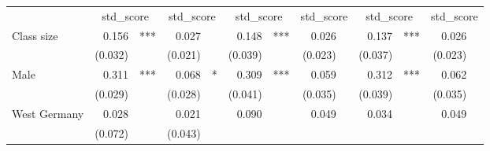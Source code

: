 \documentclass{article}
\begin{document}
\begin{table}[!h]
\centering
\begin{tabular}{lllllllllllll}
\cline{1-13}
\multicolumn{1}{r}{} &
  \multicolumn{2}{c}{std\_score} &
  \multicolumn{2}{c}{std\_score} &
  \multicolumn{2}{c}{std\_score} &
  \multicolumn{2}{c}{std\_score} &
  \multicolumn{2}{c}{std\_score} &
  \multicolumn{2}{c}{std\_score} \\
\cline{1-13}
\multicolumn{1}{l}{Class size} &
  \multicolumn{1}{r}{0.156} &
  \multicolumn{1}{l}{***} &
  \multicolumn{1}{r}{0.027} &
  \multicolumn{1}{l}{} &
  \multicolumn{1}{r}{0.148} &
  \multicolumn{1}{l}{***} &
  \multicolumn{1}{r}{0.026} &
  \multicolumn{1}{l}{} &
  \multicolumn{1}{r}{0.137} &
  \multicolumn{1}{l}{***} &
  \multicolumn{1}{r}{0.026} &
  \multicolumn{1}{l}{} \\
\multicolumn{1}{l}{} &
  \multicolumn{1}{r}{(0.032)} &
  \multicolumn{1}{l}{} &
  \multicolumn{1}{r}{(0.021)} &
  \multicolumn{1}{l}{} &
  \multicolumn{1}{r}{(0.039)} &
  \multicolumn{1}{l}{} &
  \multicolumn{1}{r}{(0.023)} &
  \multicolumn{1}{l}{} &
  \multicolumn{1}{r}{(0.037)} &
  \multicolumn{1}{l}{} &
  \multicolumn{1}{r}{(0.023)} &
  \multicolumn{1}{l}{} \\
\multicolumn{1}{l}{Male} &
  \multicolumn{1}{r}{0.311} &
  \multicolumn{1}{l}{***} &
  \multicolumn{1}{r}{0.068} &
  \multicolumn{1}{l}{*} &
  \multicolumn{1}{r}{0.309} &
  \multicolumn{1}{l}{***} &
  \multicolumn{1}{r}{0.059} &
  \multicolumn{1}{l}{} &
  \multicolumn{1}{r}{0.312} &
  \multicolumn{1}{l}{***} &
  \multicolumn{1}{r}{0.062} &
  \multicolumn{1}{l}{} \\
\multicolumn{1}{l}{} &
  \multicolumn{1}{r}{(0.029)} &
  \multicolumn{1}{l}{} &
  \multicolumn{1}{r}{(0.028)} &
  \multicolumn{1}{l}{} &
  \multicolumn{1}{r}{(0.041)} &
  \multicolumn{1}{l}{} &
  \multicolumn{1}{r}{(0.035)} &
  \multicolumn{1}{l}{} &
  \multicolumn{1}{r}{(0.039)} &
  \multicolumn{1}{l}{} &
  \multicolumn{1}{r}{(0.035)} &
  \multicolumn{1}{l}{} \\
\multicolumn{1}{l}{West Germany} &
  \multicolumn{1}{r}{0.028} &
  \multicolumn{1}{l}{} &
  \multicolumn{1}{r}{0.021} &
  \multicolumn{1}{l}{} &
  \multicolumn{1}{r}{0.090} &
  \multicolumn{1}{l}{} &
  \multicolumn{1}{r}{0.049} &
  \multicolumn{1}{l}{} &
  \multicolumn{1}{r}{0.034} &
  \multicolumn{1}{l}{} &
  \multicolumn{1}{r}{0.049} &
  \multicolumn{1}{l}{} \\
\multicolumn{1}{l}{} &
  \multicolumn{1}{r}{(0.072)} &
  \multicolumn{1}{l}{} &
  \multicolumn{1}{r}{(0.043)} &
  \multicolumn{1}{l}{} &

\end{tabular}
\end{table}
\end{document}

